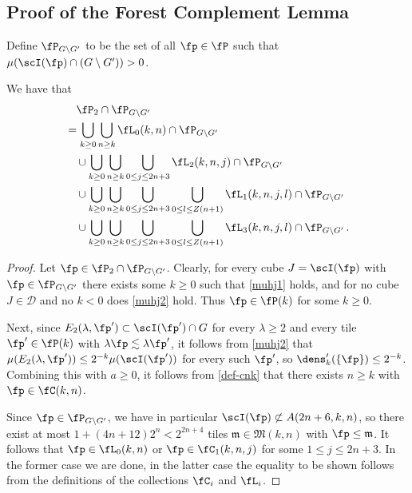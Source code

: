 \subsection{Proof of the Forest Complement Lemma}
\label{subsecantichain}

Define $\fP_{G \setminus G'}$ to be the set of all $\fp \in \fP$ such that $\mu(\scI(\fp) \cap (G \setminus  G')) > 0$.
\begin{lemma}
    \label{antichain-decomposition}
    \leanok
    We have that
    \begin{align}
        \label{eq-fp'-decomposition}
        &\quad \fP_2 \cap \fP_{G \setminus G'}\\
        &= \bigcup_{k \ge 0} \bigcup_{n \ge k} \fL_0(k,n) \cap \fP_{G \setminus G'} \\
        &\quad\cup \bigcup_{k \ge 0} \bigcup_{n \ge k}\bigcup_{0 \le j \le 2n+3} \fL_2(k,n,j) \cap \fP_{G \setminus G'}\\
        &\quad\cup \bigcup_{k \ge 0} \bigcup_{n \ge k}\bigcup_{0 \le j \le 2n+3} \bigcup_{0 \le l \le Z(n+1)} \fL_1(k,n,j,l) \cap \fP_{G \setminus G'}\\
        &\quad\cup \bigcup_{k \ge 0} \bigcup_{n \ge k}\bigcup_{0 \le j \le 2n+3} \bigcup_{0 \le l \le Z(n+1)} \fL_3(k,n,j,l)\cap \fP_{G \setminus G'}\,.
    \end{align}
\end{lemma}

\begin{proof}
    \leanok
    Let $\fp \in \fP_2 \cap \fP_{G \setminus G'}$. Clearly, for every cube $J = \scI(\fp)$ with $\fp \in \fP_{G \setminus G'}$ there exists some $k \ge 0$ such that \eqref{muhj1} holds, and for no cube $J \in \mathcal{D}$ and no $k < 0$ does \eqref{muhj2} hold. Thus $\fp \in \fP(k)$ for some $k \ge 0$.

    Next, since $E_2(\lambda, \fp') \subset \scI(\fp')\cap G$ for every $\lambda \ge 2$ and every tile $\fp' \in \fP(k)$ with $\lambda\fp \lesssim \lambda \fp'$, it follows from \eqref{muhj2} that $\mu(E_2(\lambda, \fp')) \le 2^{-k} \mu(\scI(\fp'))$ for every such $\fp'$, so $\dens_k'(\{\fp\}) \le 2^{-k}$. Combining this with $a \ge 0$, it follows from \eqref{def-cnk} that there exists $n\ge k$ with $\fp \in \fC(k,n)$.

    Since $\fp \in \fP_{G \setminus G'}$, we have in particular $\scI(\fp) \not \subset A(2n + 6, k, n)$, so there exist at most $1 + (4n + 12)2^n < 2^{2n+4}$ tiles $\mathfrak{m} \in \mathfrak{M}(k,n)$ with $\fp \le \mathfrak{m}$. It follows that $\fp \in \fL_0(k,n)$ or $\fp \in \fC_1(k,n,j)$ for some $1 \le j \le 2n + 3$. In the former case we are done, in the latter case the equality to be shown follows from the definitions of the collections $\fC_i$ and $\fL_i$.
\end{proof}

